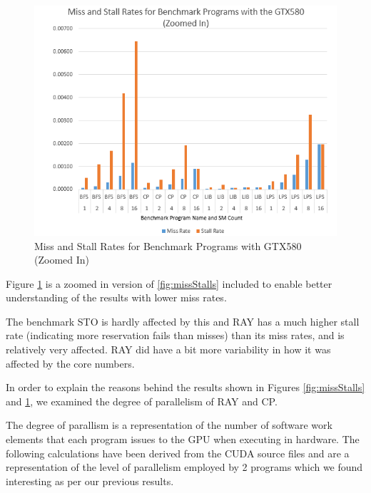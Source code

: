 \begin{figure}[b!]
\centering
\includegraphics[width=\columnwidth]{graphics/miss_stalls_benchmarks_zoomed.png}
\caption{Miss and Stall Rates for Benchmark Programs with GTX580 (Zoomed In) }
\label{fig:missStallsZoomed}
\end{figure}

Figure \ref{fig:missStallsZoomed} is a zoomed in version of
\ref{fig:missStalls} included to enable better understanding of the
results with lower miss rates. 

The benchmark STO is hardly affected by this and RAY has a much higher
stall rate (indicating more reservation fails than misses) than its
miss rates, and is relatively very affected. 
RAY did have a bit more variability in how it was affected by the core
numbers.

In order to explain the reasons behind the results shown in Figures
\ref{fig:missStalls} and \ref{fig:missStallsZoomed}, we examined the
degree of parallelism of RAY and CP.

The degree of parallism is a representation of the number of software
work elements that each program issues to the GPU when executing in
hardware. 
The following calculations have been derived from the CUDA source
files and are a representation of the level of parallelism employed by
2 programs which we found interesting as per our previous results.


